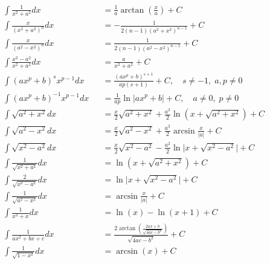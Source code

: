 \begin{footnotesize}
\begin{align*}
         & \int \frac{1}{x^2+a^2}dx              &  & =\frac{1}{a}\arctan(\frac{x}{a})+C                                                \\
         & \int \frac{x}{{(x^2+a^2)}^n}dx        &  & =-\frac{1}{2(n-1){(a^2+x^2)}^{n-1}}+C                                             \\
         & \int \frac{x}{{(a^2-x^2)}^n}dx        &  & =\frac{1}{2(n-1){(a^2-x^2)}^{n-1}}+C                                              \\
         & \int \frac{x^2-a^2}{x^2+a^2}dx        &  & =\frac{a}{x^2+a^2}+C                                                              \\
         & \int {(ax^p+b)}^s x^{p-1}dx           &  & =\frac{{(ax^p+b)}^{s+1}}{ap(s+1)}+C,\quad s\neq -1,\; a, p\neq 0                  \\
         & \int {(ax^p+b)}^{-1}x^{p-1}dx         &  & =\frac{1}{ap}\ln\vert ax^p+b\vert +C,\quad a\neq 0,\; p\neq 0                     \\
         & \int \sqrt{a^2+x^2}dx                 &  & =\frac{x}{2}\sqrt{a^2+x^2}+\frac{a^2}{2}\ln(x+\sqrt{a^2+x^2})+C                   \\
         & \int \sqrt{a^2-x^2}dx                 &  & =\frac{x}{2}\sqrt{a^2-x^2}+\frac{a^2}{2}\arcsin\frac{x}{\vert a \vert}+C          \\
         & \int \sqrt{x^2-a^2}dx                 &  & =\frac{x}{2}\sqrt{x^2-a^2}-\frac{a^2}{2}\ln\big\vert x+\sqrt{x^2-a^2}\big\vert +C \\
         & \int \frac{1}{\sqrt{x^2+a^2}}dx       &  & =\ln(x+\sqrt{a^2+x^2})+C                                                          \\
         & \int \frac{2}{\sqrt{x^2-a^2}}dx       &  & =\ln\vert x+\sqrt{x^2-a^2}\vert +C                                                \\
         & \int \frac{1}{\sqrt{a^2-x^2}}dx       &  & =\arcsin\frac{x}{\vert a\vert }+C                                                 \\
         & \int \frac{1}{x^2+x}dx                &  & =\ln(x)-\ln(x+1)+C                                                                \\
         & \int \frac{1}{ax^2+bx+c}dx            &  & =\frac{2\arctan(\frac{2ax+b}{\sqrt{4ac-b^2}})}{\sqrt{4ac-b^2}}+C                  \\
         & \int \frac{1}{\sqrt{1-x^2}}dx         &  & =\arcsin(x)+C                                                                     \\

\end{align*}
\end{footnotesize}
